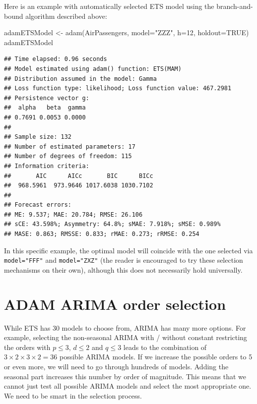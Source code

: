 \documentclass[
]{book}
\newenvironment{Shaded}{\begin{snugshade}}{\end{snugshade}}
\newcommand{\AttributeTok}[1]{\textcolor[rgb]{0.77,0.63,0.00}{#1}}
\newcommand{\ConstantTok}[1]{\textcolor[rgb]{0.00,0.00,0.00}{#1}}
\newcommand{\DecValTok}[1]{\textcolor[rgb]{0.00,0.00,0.81}{#1}}
\newcommand{\FunctionTok}[1]{\textcolor[rgb]{0.00,0.00,0.00}{#1}}
\newcommand{\NormalTok}[1]{#1}
\newcommand{\OtherTok}[1]{\textcolor[rgb]{0.56,0.35,0.01}{#1}}
\newcommand{\StringTok}[1]{\textcolor[rgb]{0.31,0.60,0.02}{#1}}
\theoremstyle{definition}
\theoremstyle{definition}
\theoremstyle{definition}
\theoremstyle{definition}
\theoremstyle{remark}
\begin{document}
Here is an example with automatically selected ETS model using the branch-and-bound algorithm described above:

\begin{Shaded}
\begin{Highlighting}[]
\NormalTok{adamETSModel }\OtherTok{\textless{}{-}} \FunctionTok{adam}\NormalTok{(AirPassengers, }\AttributeTok{model=}\StringTok{"ZZZ"}\NormalTok{, }\AttributeTok{h=}\DecValTok{12}\NormalTok{, }\AttributeTok{holdout=}\ConstantTok{TRUE}\NormalTok{)}
\NormalTok{adamETSModel}
\end{Highlighting}
\end{Shaded}

\begin{verbatim}
## Time elapsed: 0.96 seconds
## Model estimated using adam() function: ETS(MAM)
## Distribution assumed in the model: Gamma
## Loss function type: likelihood; Loss function value: 467.2981
## Persistence vector g:
##  alpha   beta  gamma 
## 0.7691 0.0053 0.0000 
## 
## Sample size: 132
## Number of estimated parameters: 17
## Number of degrees of freedom: 115
## Information criteria:
##       AIC      AICc       BIC      BICc 
##  968.5961  973.9646 1017.6038 1030.7102 
## 
## Forecast errors:
## ME: 9.537; MAE: 20.784; RMSE: 26.106
## sCE: 43.598%; Asymmetry: 64.8%; sMAE: 7.918%; sMSE: 0.989%
## MASE: 0.863; RMSSE: 0.833; rMAE: 0.273; rRMSE: 0.254
\end{verbatim}

In this specific example, the optimal model will coincide with the one selected via \texttt{model="FFF"} and \texttt{model="ZXZ"} (the reader is encouraged to try these selection mechanisms on their own), although this does not necessarily hold universally.

\hypertarget{ARIMASelection}{%
\section{ADAM ARIMA order selection}\label{ARIMASelection}}

While ETS has 30 models to choose from, ARIMA has many more options. For example, selecting the non-seasonal ARIMA with / without constant restricting the orders with \(p \leq 3\), \(d \leq 2\) and \(q \leq 3\) leads to the combination of \(3 \times 2 \times 3 \times 2 = 36\) possible ARIMA models. If we increase the possible orders to 5 or even more, we will need to go through hundreds of models. Adding the seasonal part increases this number by order of magnitude. This means that we cannot just test all possible ARIMA models and select the most appropriate one. We need to be smart in the selection process.
\end{document}

